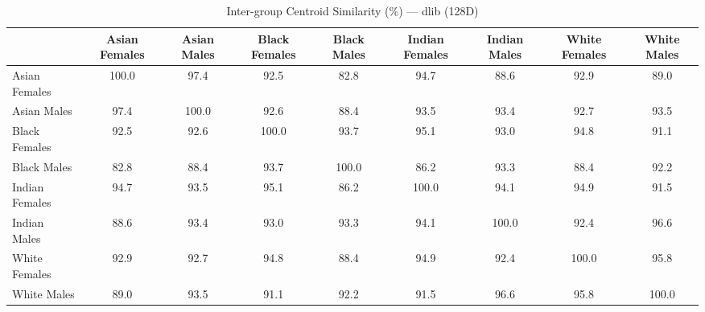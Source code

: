 \begin{table}[htbp]
\centering
\caption{Inter-group Centroid Similarity (\%) — dlib (128D)}
\label{tab:inter-dlib}
\tiny
\begin{tabular}{lcccccccc}
\toprule
 & Asian Females & Asian Males & Black Females & Black Males & Indian Females & Indian Males & White Females & White Males \\
\midrule
Asian Females & 100.0 & 97.4 & 92.5 & 82.8 & 94.7 & 88.6 & 92.9 & 89.0 \\
Asian Males & 97.4 & 100.0 & 92.6 & 88.4 & 93.5 & 93.4 & 92.7 & 93.5 \\
Black Females & 92.5 & 92.6 & 100.0 & 93.7 & 95.1 & 93.0 & 94.8 & 91.1 \\
Black Males & 82.8 & 88.4 & 93.7 & 100.0 & 86.2 & 93.3 & 88.4 & 92.2 \\
Indian Females & 94.7 & 93.5 & 95.1 & 86.2 & 100.0 & 94.1 & 94.9 & 91.5 \\
Indian Males & 88.6 & 93.4 & 93.0 & 93.3 & 94.1 & 100.0 & 92.4 & 96.6 \\
White Females & 92.9 & 92.7 & 94.8 & 88.4 & 94.9 & 92.4 & 100.0 & 95.8 \\
White Males & 89.0 & 93.5 & 91.1 & 92.2 & 91.5 & 96.6 & 95.8 & 100.0 \\
\bottomrule
\end{tabular}
\end{table}
